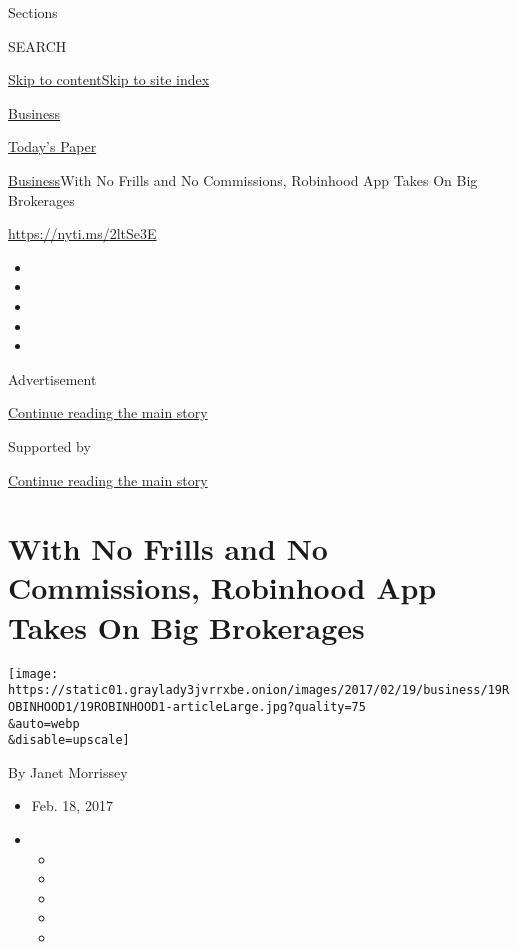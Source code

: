 Sections

SEARCH

\protect\hyperlink{site-content}{Skip to
content}\protect\hyperlink{site-index}{Skip to site index}

\href{https://www.nytimes3xbfgragh.onion/section/business}{Business}

\href{https://myaccount.nytimes3xbfgragh.onion/auth/login?response_type=cookie\&client_id=vi}{}

\href{https://www.nytimes3xbfgragh.onion/section/todayspaper}{Today's
Paper}

\href{/section/business}{Business}\textbar{}With No Frills and No
Commissions, Robinhood App Takes On Big Brokerages

\url{https://nyti.ms/2ltSe3E}

\begin{itemize}
\item
\item
\item
\item
\item
\end{itemize}

Advertisement

\protect\hyperlink{after-top}{Continue reading the main story}

Supported by

\protect\hyperlink{after-sponsor}{Continue reading the main story}

\hypertarget{with-no-frills-and-no-commissions-robinhood-app-takes-on-big-brokerages}{%
\section{With No Frills and No Commissions, Robinhood App Takes On Big
Brokerages}\label{with-no-frills-and-no-commissions-robinhood-app-takes-on-big-brokerages}}

\texttt{[image: https://static01.graylady3jvrrxbe.onion/images/2017/02/19/business/19ROBINHOOD1/19ROBINHOOD1-articleLarge.jpg?quality=75\\\&auto=webp\\\&disable=upscale]}

By Janet Morrissey

\begin{itemize}
\item
  Feb. 18, 2017
\item
  \begin{itemize}
  \item
  \item
  \item
  \item
  \item
  \end{itemize}
\end{itemize}

